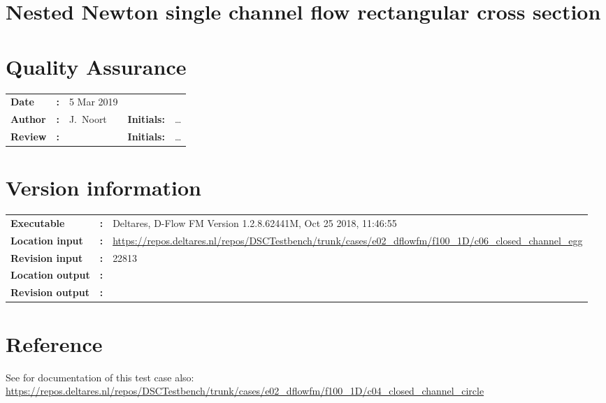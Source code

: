 

\section{Nested Newton single channel flow rectangular cross section}
\newrefsegment

\section*{Quality Assurance}
\begin{tabular}{@{}p{27mm}@{}p{0mm}p{\textwidth-52mm-48pt}p{15mm}p{10mm}}
\textbf{Date} & \textbf{:} &  5 Mar 2019  \\ 
\textbf{Author} & \textbf{:} &  J.\ Noort & \textbf{Initials:} & \ldots \\
\textbf{Review} & \textbf{:} &   & \textbf{Initials:} & \ldots 
\end{tabular}

\section*{Version information}
{{
\begin{tabular}{@{}p{27mm}@{}p{0mm}p{\textwidth-27mm-24pt}}
\textbf{Executable}   & \textbf{:} & Deltares, D-Flow FM Version 1.2.8.62441M, Oct 25 2018, 11:46:55 \\
\textbf{Location input}     & \textbf{:} & \url{https://repos.deltares.nl/repos/DSCTestbench/trunk/cases/e02_dflowfm/f100_1D/c06_closed_channel_egg} \\
\textbf{Revision input} & \textbf{:} & 22813 \\
\textbf{Location output}     & \textbf{:} & \\\textbf{Revision output} & \textbf{:} & 
\end{tabular}
}}


\section*{Reference}
See for documentation of this test case also: \url{https://repos.deltares.nl/repos/DSCTestbench/trunk/cases/e02_dflowfm/f100_1D/c04_closed_channel_circle}

\printrefsegment

